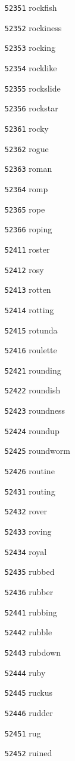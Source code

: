 \documentclass[twoside,11pt]{article}
\begin{document}
\begin{multicols}{5}
\begin{enumerate}
\item[\texttt{52351}] rockfish
\item[\texttt{52352}] rockiness
\item[\texttt{52353}] rocking
\item[\texttt{52354}] rocklike
\item[\texttt{52355}] rockslide
\item[\texttt{52356}] rockstar
\item[\texttt{52361}] rocky
\item[\texttt{52362}] rogue
\item[\texttt{52363}] roman
\item[\texttt{52364}] romp
\item[\texttt{52365}] rope
\item[\texttt{52366}] roping
\item[\texttt{52411}] roster
\item[\texttt{52412}] rosy
\item[\texttt{52413}] rotten
\item[\texttt{52414}] rotting
\item[\texttt{52415}] rotunda
\item[\texttt{52416}] roulette
\item[\texttt{52421}] rounding
\item[\texttt{52422}] roundish
\item[\texttt{52423}] roundness
\item[\texttt{52424}] roundup
\item[\texttt{52425}] roundworm
\item[\texttt{52426}] routine
\item[\texttt{52431}] routing
\item[\texttt{52432}] rover
\item[\texttt{52433}] roving
\item[\texttt{52434}] royal
\item[\texttt{52435}] rubbed
\item[\texttt{52436}] rubber
\item[\texttt{52441}] rubbing
\item[\texttt{52442}] rubble
\item[\texttt{52443}] rubdown
\item[\texttt{52444}] ruby
\item[\texttt{52445}] ruckus
\item[\texttt{52446}] rudder
\item[\texttt{52451}] rug
\item[\texttt{52452}] ruined

\end{enumerate}
\end{multicols}
\end{document}
